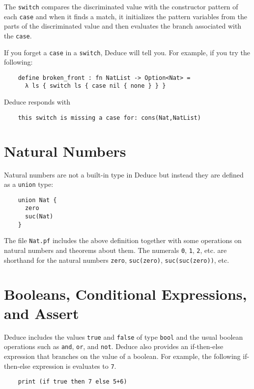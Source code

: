 \documentclass[12pt]{article}
\begin{document}
The \texttt{switch} compares the discriminated value with the
constructor pattern of each \texttt{case} and when it finds a match,
it initializes the pattern variables from the parts of the
discriminated value and then evaluates the branch associated with the
\texttt{case}.

If you forget a \texttt{case} in a \texttt{switch}, Deduce will tell
you. For example, if you try the following:
\begin{verbatim}
    define broken_front : fn NatList -> Option<Nat> =
      λ ls { switch ls { case nil { none } } }
\end{verbatim}
\noindent Deduce responds with
\begin{verbatim}
    this switch is missing a case for: cons(Nat,NatList)
\end{verbatim}


\section{Natural Numbers}

Natural numbers are not a built-in type in Deduce but instead they are
defined as a \texttt{union} type:

\begin{verbatim}
    union Nat {
      zero
      suc(Nat)
    }
\end{verbatim}

The file \texttt{Nat.pf} includes the above definition together with
some operations on natural numbers and theorems about them.  The
numerals \texttt{0}, \texttt{1}, \texttt{2}, etc. are shorthand for
the natural numbers \texttt{zero}, \texttt{suc(zero)},
\texttt{suc(suc(zero))}, etc.

\section{Booleans, Conditional Expressions, and Assert}

Deduce includes the values \texttt{true} and \texttt{false} of type
\texttt{bool} and the usual boolean operations such as \texttt{and},
\texttt{or}, and \texttt{not}.  Deduce also provides an if-then-else
expression that branches on the value of a boolean. For example, the
following if-then-else expression is evaluates to \texttt{7}.

\begin{verbatim}
    print (if true then 7 else 5+6)
\end{verbatim}
\end{document}
